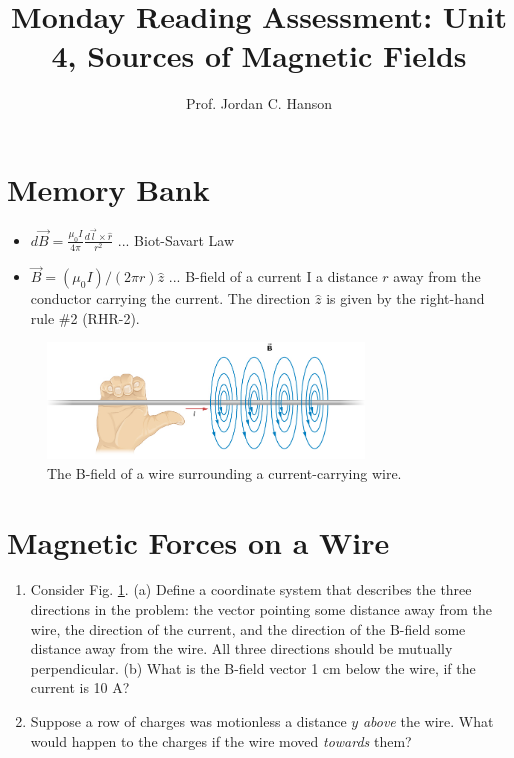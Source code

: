 \documentclass{article}
\begin{document}
\title{Monday Reading Assessment: Unit 4, Sources of Magnetic Fields}
\author{Prof. Jordan C. Hanson}

\maketitle

\section{Memory Bank}

\begin{itemize}
\item $d\vec{B} = \frac{\mu_0 I}{4\pi} \frac{d\vec{l}\times\hat{r}}{r^2}$ ... Biot-Savart Law
\item $\vec{B} = (\mu_0 I) / (2 \pi r) \hat{z}$ ... B-field of a current I a distance $r$ away from the conductor carrying the current.  The direction $\hat{z}$ is given by the right-hand rule \#2 (RHR-2).
\end{itemize}

\begin{figure}[ht]
\centering
\includegraphics[width=0.75\textwidth]{wireBfield.jpeg}
\caption{\label{fig:fields} The B-field of a wire surrounding a current-carrying wire.}
\end{figure}

\section{Magnetic Forces on a Wire}

\begin{enumerate}
\item Consider Fig. \ref{fig:fields}.  (a) Define a coordinate system that describes the three directions in the problem: the vector pointing some distance away from the wire, the direction of the current, and the direction of the B-field some distance away from the wire.  All three directions should be mutually perpendicular. (b) What is the B-field vector 1 cm below the wire, if the current is 10 A? \\ \vspace{2cm}
\item Suppose a row of charges was motionless a distance $y$ \textit{above} the wire.  What would happen to the charges if the wire moved \textit{towards} them?
\end{enumerate}
\end{document}
